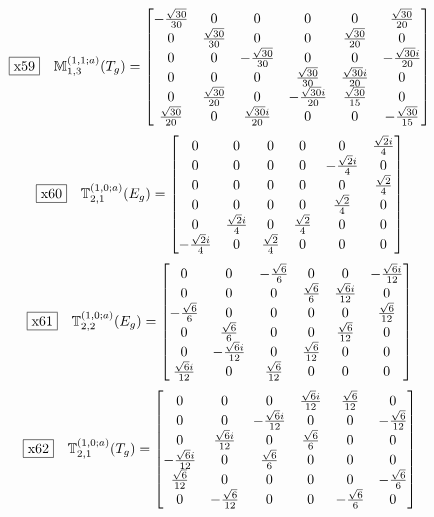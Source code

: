 \documentclass[fleqn,10pt,landscape]{jsarticle}
\begin{document}
\begin{dmath*}
\fbox{x59}\quad \mathbb{M}_{1,3}^{(1,1;a)}(T_{g})=\begin{bmatrix} - \frac{\sqrt{30}}{30} & 0 & 0 & 0 & 0 & \frac{\sqrt{30}}{20} \\ 0 & \frac{\sqrt{30}}{30} & 0 & 0 & \frac{\sqrt{30}}{20} & 0 \\ 0 & 0 & - \frac{\sqrt{30}}{30} & 0 & 0 & - \frac{\sqrt{30} i}{20} \\ 0 & 0 & 0 & \frac{\sqrt{30}}{30} & \frac{\sqrt{30} i}{20} & 0 \\ 0 & \frac{\sqrt{30}}{20} & 0 & - \frac{\sqrt{30} i}{20} & \frac{\sqrt{30}}{15} & 0 \\ \frac{\sqrt{30}}{20} & 0 & \frac{\sqrt{30} i}{20} & 0 & 0 & - \frac{\sqrt{30}}{15} \end{bmatrix}
\end{dmath*}
\begin{dmath*}
\fbox{x60}\quad \mathbb{T}_{2,1}^{(1,0;a)}(E_{g})=\begin{bmatrix} 0 & 0 & 0 & 0 & 0 & \frac{\sqrt{2} i}{4} \\ 0 & 0 & 0 & 0 & - \frac{\sqrt{2} i}{4} & 0 \\ 0 & 0 & 0 & 0 & 0 & \frac{\sqrt{2}}{4} \\ 0 & 0 & 0 & 0 & \frac{\sqrt{2}}{4} & 0 \\ 0 & \frac{\sqrt{2} i}{4} & 0 & \frac{\sqrt{2}}{4} & 0 & 0 \\ - \frac{\sqrt{2} i}{4} & 0 & \frac{\sqrt{2}}{4} & 0 & 0 & 0 \end{bmatrix}
\end{dmath*}
\begin{dmath*}
\fbox{x61}\quad \mathbb{T}_{2,2}^{(1,0;a)}(E_{g})=\begin{bmatrix} 0 & 0 & - \frac{\sqrt{6}}{6} & 0 & 0 & - \frac{\sqrt{6} i}{12} \\ 0 & 0 & 0 & \frac{\sqrt{6}}{6} & \frac{\sqrt{6} i}{12} & 0 \\ - \frac{\sqrt{6}}{6} & 0 & 0 & 0 & 0 & \frac{\sqrt{6}}{12} \\ 0 & \frac{\sqrt{6}}{6} & 0 & 0 & \frac{\sqrt{6}}{12} & 0 \\ 0 & - \frac{\sqrt{6} i}{12} & 0 & \frac{\sqrt{6}}{12} & 0 & 0 \\ \frac{\sqrt{6} i}{12} & 0 & \frac{\sqrt{6}}{12} & 0 & 0 & 0 \end{bmatrix}
\end{dmath*}
\begin{dmath*}
\fbox{x62}\quad \mathbb{T}_{2,1}^{(1,0;a)}(T_{g})=\begin{bmatrix} 0 & 0 & 0 & \frac{\sqrt{6} i}{12} & \frac{\sqrt{6}}{12} & 0 \\ 0 & 0 & - \frac{\sqrt{6} i}{12} & 0 & 0 & - \frac{\sqrt{6}}{12} \\ 0 & \frac{\sqrt{6} i}{12} & 0 & \frac{\sqrt{6}}{6} & 0 & 0 \\ - \frac{\sqrt{6} i}{12} & 0 & \frac{\sqrt{6}}{6} & 0 & 0 & 0 \\ \frac{\sqrt{6}}{12} & 0 & 0 & 0 & 0 & - \frac{\sqrt{6}}{6} \\ 0 & - \frac{\sqrt{6}}{12} & 0 & 0 & - \frac{\sqrt{6}}{6} & 0 \end{bmatrix}
\end{dmath*}
\end{document}
